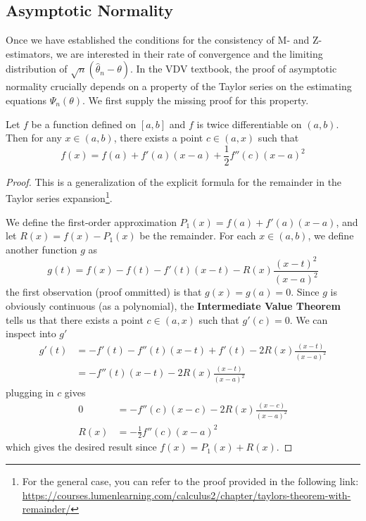 \documentclass{article}
\begin{document}
\subsection{Asymptotic Normality}
Once we have established the conditions for the consistency of M- and Z-estimators, we are interested in their rate of convergence and the limiting distribution of $\sqrt{n}(\hat{\theta}_n - \theta)$. In the VDV textbook, the proof of asymptotic normality crucially depends on a property of the Taylor series on the estimating equations $\Psi_n(\theta)$. We first supply the missing proof for this property.
\begin{lemma}
    Let $f$ be a function defined on $[a, b]$ and $f$ is twice differentiable on $(a, b)$. Then for any $x \in (a, b)$, there exists a point $c \in (a, x)$ such that
    \begin{equation}
        f(x) = f(a) + f'(a)(x - a) + \frac{1}{2}f''(c)(x - a)^2
    \end{equation}
\end{lemma}
\begin{proof}
    This is a generalization of the explicit formula for the remainder in the Taylor series expansion\footnote{For the general case, you can refer to the proof provided in the following link: \url{https://courses.lumenlearning.com/calculus2/chapter/taylors-theorem-with-remainder/}}.

    We define the first-order approximation $P_1(x) = f(a) + f'(a)(x - a)$, and let $R(x) = f(x) - P_1(x)$ be the remainder. For each $x \in (a, b)$, we define another function $g$ as
    \begin{equation}
        g(t) = f(x) - f(t) - f'(t)(x - t) - R(x)\frac{(x-t)^2}{(x-a)^2}
    \end{equation}
    the first observation (proof ommitted) is that $g(x) = g(a) = 0$. Since $g$ is obviously continuous (as a polynomial), the \textbf{Intermediate Value Theorem} tells us that there exists a point $c \in (a, x)$ such that $g'(c) = 0$. We can inspect into $g'$
    \begin{align}
        g'(t) &= -f'(t) - f''(t)(x - t) + f'(t) - 2R(x)\frac{(x-t)}{(x-a)^2} \\
        &= -f''(t)(x - t) - 2R(x)\frac{(x-t)}{(x-a)^2}
    \end{align}
    plugging in $c$ gives
    \begin{align}
        0 &= -f''(c)(x - c) - 2R(x)\frac{(x-c)}{(x-a)^2} \\
        R(x) &= -\frac{1}{2}f''(c)(x - a)^2
    \end{align}
    which gives the desired result since $f(x) = P_1(x) + R(x)$.
\end{proof}
\newpage
\end{document}
